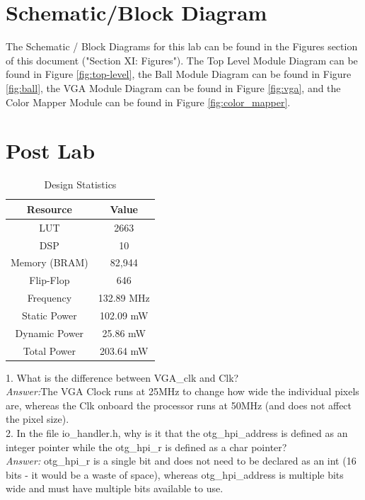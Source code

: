 \documentclass[journal, twocolumn, final,11pt,letterpaper]{IEEEtran}
\begin{document}
\section{Schematic/Block Diagram}
The Schematic / Block Diagrams for this lab can be found in the Figures section of this document ("Section XI: Figures"). The Top Level Module Diagram can be found in Figure \ref{fig:top-level}, the Ball Module Diagram can be found in Figure \ref{fig:ball}, the VGA Module Diagram can be found in Figure \ref{fig:vga}, and the Color Mapper Module can be found in Figure \ref{fig:color_mapper}.

\section{Post Lab}
\begin{table}[htbp]
	\centering
	\begin{tabular}{c|c}	%
		\toprule	%
		Resource & Value \\
		\midrule
		LUT & 2663\\
		DSP & 10\\
		Memory (BRAM) & 82,944\\
		Flip-Flop & 646\\
		Frequency &   132.89 MHz\\
		Static Power & 102.09 mW\\
		Dynamic Power &  25.86 mW\\
		Total Power & 203.64 mW\\
		\bottomrule	%
	\end{tabular}%
	\caption{Design Statistics}
	\label{tab:design}
\end{table}

1. What is the difference between VGA\_clk and Clk? \\

\textit{Answer:}The VGA Clock runs at 25MHz to change how wide the individual pixels are, whereas the Clk onboard the processor runs at 50MHz (and does not affect the pixel size).\\

2. In the file io\_handler.h, why is it that the otg\_hpi\_address is defined as an integer pointer while the otg\_hpi\_r is defined as a char pointer? \\

\textit{Answer:} otg\_hpi\_r is a single bit and does not need to be declared as an int (16 bits - it would be a waste of space), whereas otg\_hpi\_address is multiple bits wide and must have multiple bits available to use.\\
\end{document}

